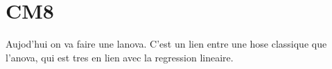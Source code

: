 \chapter{CM8}

Aujod'hui on va faire une lanova. C'est un lien entre une  hose classique que l'anova, qui est tres en lien avec la regression lineaire.
